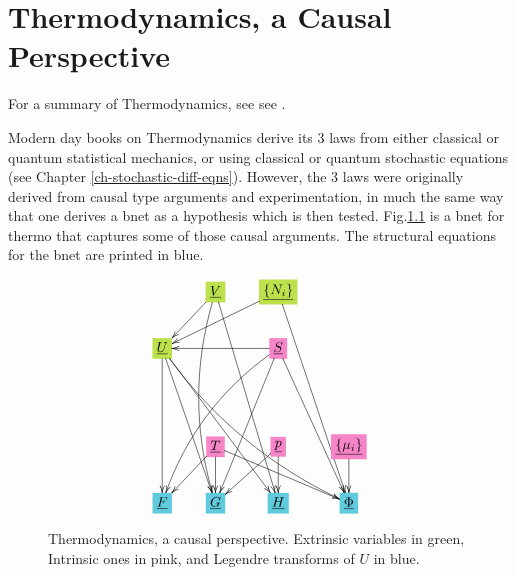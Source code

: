\chapter{Thermodynamics, a Causal Perspective}
\label{ch-thermo}

For a summary of Thermodynamics, see
see \cite{wiki-thermo}.

Modern day books on Thermodynamics
derive its 3 laws from either classical
or quantum statistical mechanics, or using classical or quantum stochastic  equations
(see Chapter \ref{ch-stochastic-diff-eqns}). However,
the 3 laws 
were originally derived from causal type
	arguments and experimentation, in much
	the same way that one  derives a bnet
	as a hypothesis which is then tested.
Fig.\ref{fig-texnn-for-thermo} is a bnet for thermo that
captures some of those causal arguments.
The structural equations for the bnet are printed in blue.

	


\begin{figure}[h!]\centering
	$$\xymatrix{
		&*+[F*:SpringGreen]{\underline{V}}\ar@/_1pc/[dddd]\ar[ddddr]\ar[dl]&*+[F*:SpringGreen]{\underline{\{N_i\}}}\ar[ddddr]\ar[dll]&
		\\
		*+[F*:SpringGreen]{\underline{U}}\ar@/_1pc/[dddrrr]\ar[ddd]\ar[dddr]\ar[dddrr]&&*+[F*:Lavender]{\underline{S}}\ar[dddr]\ar@/_1pc/[dddll]\ar[dddl]\ar[ll]&
		\\
		&&&
		\\
		&*+[F*:Lavender]{\underline{T}}\ar[drr]\ar[dl]\ar[d]&*+[F*:Lavender]{\underline{p}}\ar[dl]\ar[d]&*+[F*:Lavender]{\underline{\{\mu_i\}}}\ar[d]
		\\
		*+[F*:SkyBlue]{\underline{F}}&*+[F*:SkyBlue]{\underline{G}}&*+[F*:SkyBlue]{\underline{H}}&*+[F*:SkyBlue]{\underline{\Phi}}
	}$$
	\caption{Thermodynamics, a causal perspective. Extrinsic variables in green, Intrinsic ones in pink, and Legendre  transforms of $U$ in blue.}
	\label{fig-texnn-for-thermo}
\end{figure}

